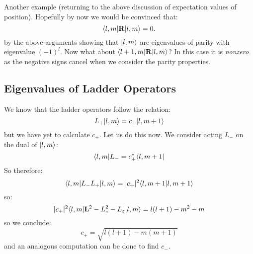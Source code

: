 Another example (returning to the above discussion of expectation values of position). Hopefully by now we would be convinced that:
\begin{equation}
    \langle l, m \rvert\mathbf{R}\lvert l, m \rangle  = 0.
\end{equation}
by the above arguments showing that $\lvert l, m \rangle$ are eigenvalues of parity with eigenvalue $(-1)^l$. Now what about $\langle l+1, m \rvert\mathbf{R}\lvert l, m \rangle$? In this case it is \emph{nonzero} as the negative signs cancel when we consider the parity properties.

\subsection{Eigenvalues of Ladder Operators}
We know that the ladder operators follow the relation:
\begin{equation}
    L_+\lvert l, m \rangle = c_+\lvert l, m+1 \rangle
\end{equation}
but we have yet to calculate $c_+$. Let us do this now. We consider acting $L_-$ on the dual of $\lvert l, m \rangle$:
\begin{equation}
    \langle l, m \rvert L_- = c_+^*\langle l, m+1 \rvert
\end{equation}
So therefore:
\begin{equation}
    \langle l, m \rvert L_-L_+\lvert l, m \rangle = \lvert c_+ \rvert^2\langle l, m+1 \lvert l, m+1 \rangle
\end{equation}
so:
\begin{equation}
    \lvert c_+ \rvert^2\langle l, m \rvert\mathbf{L}^2 - L_z^2 - L_z\lvert l, m \rangle = l(l+1) - m^2 - m
\end{equation}
so we conclude:
\begin{equation}
    c_+ = \sqrt{l(l+1) - m(m+1)}
\end{equation}
and an analogous computation can be done to find $c_-$.

